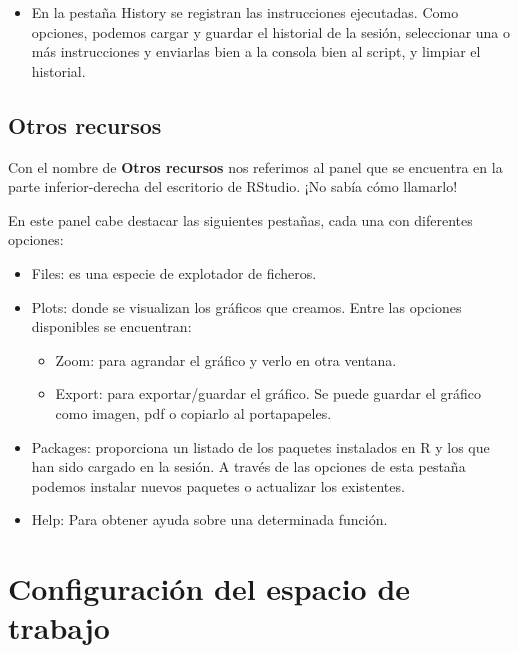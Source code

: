\documentclass[
]{book}
\providecommand{\tightlist}{%
  \setlength{\itemsep}{0pt}\setlength{\parskip}{0pt}}
\begin{document}
\begin{itemize}
\tightlist
\item
  En la pestaña History se registran las instrucciones ejecutadas. Como opciones, podemos cargar y guardar el historial de la sesión, seleccionar una o más instrucciones y enviarlas bien a la consola bien al script, y limpiar el historial.
\end{itemize}

\hypertarget{otros-recursos}{%
\subsection{Otros recursos}\label{otros-recursos}}

Con el nombre de \textbf{Otros recursos} nos referimos al panel que se encuentra en la parte inferior-derecha del escritorio de RStudio. ¡No sabía cómo llamarlo!

En este panel cabe destacar las siguientes pestañas, cada una con diferentes opciones:

\begin{itemize}
\item
  Files: es una especie de explotador de ficheros.
\item
  Plots: donde se visualizan los gráficos que creamos. Entre las opciones disponibles se encuentran:

  \begin{itemize}
  \tightlist
  \item
    Zoom: para agrandar el gráfico y verlo en otra ventana.
  \item
    Export: para exportar/guardar el gráfico. Se puede guardar el gráfico como imagen, pdf o copiarlo al portapapeles.
  \end{itemize}
\item
  Packages: proporciona un listado de los paquetes instalados en R y los que han sido cargado en la sesión. A través de las opciones de esta pestaña podemos instalar nuevos paquetes o actualizar los existentes.
\item
  Help: Para obtener ayuda sobre una determinada función.
\end{itemize}

\hypertarget{configuraciuxf3n-del-espacio-de-trabajo}{%
\section{Configuración del espacio de trabajo}\label{configuraciuxf3n-del-espacio-de-trabajo}}
\end{document}
